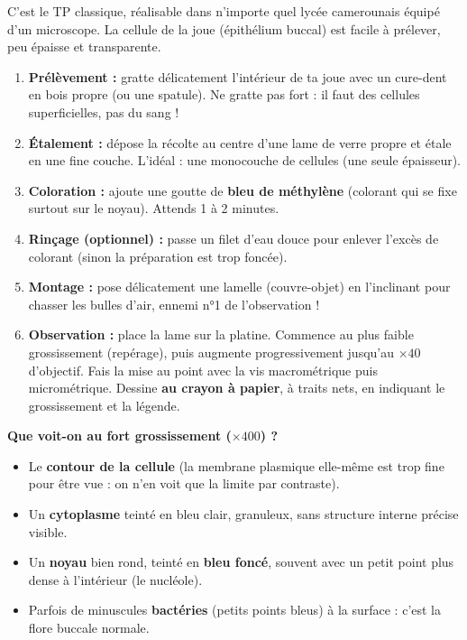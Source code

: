 \documentclass[11pt]{article}
\newcommand{\cle}[1]{{\popxbold\color{popdark}#1}}
\begin{document}
C'est le TP classique, réalisable dans n'importe quel lycée camerounais équipé d'un microscope. La cellule de la joue (épithélium buccal) est facile à prélever, peu épaisse et transparente.

\begin{methode}
\begin{enumerate}
    \item \textbf{Prélèvement :} gratte délicatement l'intérieur de ta joue avec un cure-dent en bois propre (ou une spatule). Ne gratte pas fort : il faut des cellules superficielles, pas du sang !
    \item \textbf{Étalement :} dépose la récolte au centre d'une lame de verre propre et étale en une fine couche. L'idéal : une monocouche de cellules (une seule épaisseur).
    \item \textbf{Coloration :} ajoute une goutte de \textbf{bleu de méthylène} (colorant qui se fixe surtout sur le noyau). Attends 1 à 2 minutes.
    \item \textbf{Rinçage (optionnel) :} passe un filet d'eau douce pour enlever l'excès de colorant (sinon la préparation est trop foncée).
    \item \textbf{Montage :} pose délicatement une lamelle (couvre-objet) en l'inclinant pour chasser les bulles d'air, ennemi n°1 de l'observation !
    \item \textbf{Observation :} place la lame sur la platine. Commence au plus faible grossissement (repérage), puis augmente progressivement jusqu'au $\times 40$ d'objectif. Fais la mise au point avec la vis macrométrique puis micrométrique. Dessine \textbf{au crayon à papier}, à traits nets, en indiquant le grossissement et la légende.
\end{enumerate}
\end{methode}

\noindent
\textbf{Que voit-on au fort grossissement ($\times 400$) ?}
\begin{itemize}
    \item Le \textbf{contour de la cellule} (la \cle{membrane plasmique} elle-même est trop fine pour être vue : on n'en voit que la limite par contraste).
    \item Un \textbf{cytoplasme} teinté en bleu clair, granuleux, sans structure interne précise visible.
    \item Un \textbf{noyau} bien rond, teinté en \textbf{bleu foncé}, souvent avec un petit point plus dense à l'intérieur (le nucléole).
    \item Parfois de minuscules \textbf{bactéries} (petits points bleus) à la surface : c'est la flore buccale normale.
\end{itemize}
\end{document}
